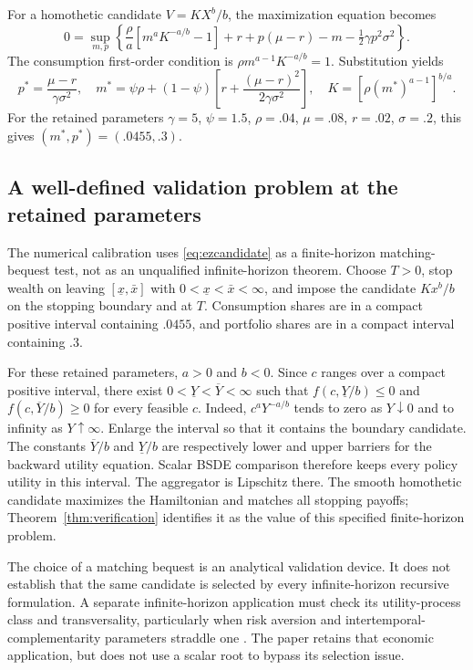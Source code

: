 For a homothetic candidate $V=KX^b/b$, the maximization equation becomes
\begin{equation}\label{eq:eznormalized}
 0=\sup_{m,p}\left\{\frac\rho a[m^aK^{-a/b}-1]
       +r+p(\mu-r)-m-\tfrac12\gamma p^2\sigma^2\right\}.
\end{equation}
The consumption first-order condition is $\rho m^{a-1}K^{-a/b}=1$. Substitution yields
\begin{equation}\label{eq:ezcandidate}
 p^*=\frac{\mu-r}{\gamma\sigma^2},\quad
 m^*=\psi\rho+(1-\psi)\left[r+\frac{(\mu-r)^2}{2\gamma\sigma^2}\right],\quad
 K=[\rho(m^*)^{a-1}]^{b/a}.
\end{equation}
For the retained parameters $\gamma=5$, $\psi=1.5$, $\rho=.04$, $\mu=.08$, $r=.02$, $\sigma=.2$, this gives $(m^*,p^*)=(.0455,.3)$.

\subsection{A well-defined validation problem at the retained parameters}
The numerical calibration uses \eqref{eq:ezcandidate} as a finite-horizon matching-bequest test, not as an unqualified infinite-horizon theorem. Choose $T>0$, stop wealth on leaving $[\underline x,\bar x]$ with $0<\underline x<\bar x<\infty$, and impose the candidate $Kx^b/b$ on the stopping boundary and at $T$. Consumption shares are in a compact positive interval containing $.0455$, and portfolio shares are in a compact interval containing $.3$.

For these retained parameters, $a>0$ and $b<0$. Since $c$ ranges over a compact positive interval, there exist $0<\underline Y<\overline Y<\infty$ such that $f(c,\underline Y/b)\leq0$ and $f(c,\overline Y/b)\geq0$ for every feasible $c$. Indeed, $c^aY^{-a/b}$ tends to zero as $Y\downarrow0$ and to infinity as $Y\uparrow\infty$. Enlarge the interval so that it contains the boundary candidate. The constants $\overline Y/b$ and $\underline Y/b$ are respectively lower and upper barriers for the backward utility equation. Scalar BSDE comparison therefore keeps every policy utility in this interval. The aggregator is Lipschitz there. The smooth homothetic candidate maximizes the Hamiltonian and matches all stopping payoffs; Theorem~\ref{thm:verification} identifies it as the value of this specified finite-horizon problem.

The choice of a matching bequest is an analytical validation device. It does not establish that the same candidate is selected by every infinite-horizon recursive formulation. A separate infinite-horizon application must check its utility-process class and transversality, particularly when risk aversion and intertemporal-complementarity parameters straddle one \citep{herdegen2021}. The paper retains that economic application, but does not use a scalar root to bypass its selection issue.

